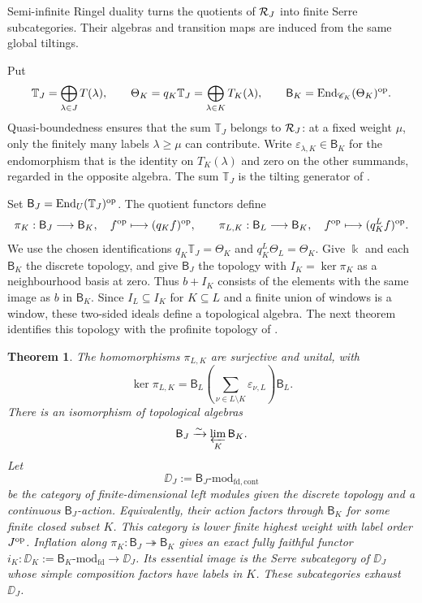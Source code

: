\documentclass[11pt,reqno]{amsart}
\newcommand{\kk}{\Bbbk}\newcommand{\ZZ}{\mathbb Z}\newcommand{\NN}{\mathbb N}
\newcommand{\BJ}{\mathsf B_J}\newcommand{\BK}{\mathsf B_K}\newcommand{\TJ}{\mathbb T_J}\newcommand{\GK}{\mathsf G_K}\newcommand{\GJ}{\mathsf G_J}
\newtheorem{theorem}{Theorem}[section]
\theoremstyle{definition}
\theoremstyle{remark}
\numberwithin{equation}{section}
\begin{document}
Semi-infinite Ringel duality turns the quotients of $\mathcal R_J$ into
finite Serre subcategories. Their algebras and transition maps are
induced from the same global tiltings.

Put
\[
 \TJ=\bigoplus_{\lambda\in J}T(\lambda),\qquad
 \Theta_K=q_K\TJ=\bigoplus_{\lambda\in K}T_K(\lambda),\qquad
 \BK=\End_{\CC_K}(\Theta_K)^{\op}.
\]
Quasi-boundedness ensures that the sum $\TJ$ belongs to $\mathcal R_J$:
at a fixed weight $\mu$, only the finitely many labels
$\lambda\geq\mu$ can contribute. Write
$\varepsilon_{\lambda,K}\in\BK$ for the endomorphism that is the
identity on $T_K(\lambda)$ and zero on the other summands, regarded
in the opposite algebra. The sum $\TJ$ is the tilting generator of
\cite[Definition~4.26]{BS}.

Set $\BJ=\End_U(\TJ)^{\op}$. The quotient functors define
\[
 \pi_K:\BJ\longrightarrow\BK,\quad f^{\op}\longmapsto(q_Kf)^{\op},
 \qquad
 \pi_{L,K}:\mathsf B_L\longrightarrow\BK,\quad
 f^{\op}\longmapsto(q_K^Lf)^{\op}.
\]
We use the chosen identifications $q_K\TJ=\Theta_K$ and
$q_K^L\Theta_L=\Theta_K$. Give $\kk$ and each $\BK$ the discrete
topology, and give $\BJ$ the topology with
$I_K=\ker\pi_K$ as a neighbourhood basis at zero.
Thus $b+I_K$ consists of the elements with the same image as $b$
in $\BK$. Since $I_L\subseteq I_K$ for $K\subseteq L$ and a
finite union of windows is a window, these two-sided ideals define
a topological algebra. The next theorem identifies this topology
with the profinite topology of \cite[Section~2.1, Lemma~2.10]{BS}.

\begin{theorem}\label{thm:ringel}
The homomorphisms $\pi_{L,K}$ are surjective and unital, with
\begin{equation}\label{eq:ringel-kernel}
 \ker\pi_{L,K}=
 \mathsf B_L\left(\sum_{\nu\in L\setminus K}
           \varepsilon_{\nu,L}\right)\mathsf B_L.
\end{equation}
There is an isomorphism of topological algebras
\begin{equation}\label{eq:ringel-limit}
 \BJ\xrightarrow{\sim}
       \varprojlim_K\BK.
\end{equation}
Let
\[
 \DD_J:=\BJ\text{-}\mathrm{mod}_{\mathrm{fd,cont}}
\]
be the category of finite-dimensional left modules given the discrete
topology and a continuous $\BJ$-action. Equivalently, their action
factors through $\BK$ for some finite closed subset $K$.
This category is lower finite highest weight with label order $J^{\mathrm{op}}$.
Inflation along $\pi_K:\BJ\twoheadrightarrow\BK$ gives an exact fully
faithful functor
$i_K:\DD_K:=\BK\text{-}\mathrm{mod}_{\mathrm{fd}}\to\DD_J$.
Its essential image is the Serre subcategory
of $\DD_J$ whose simple composition factors have labels in $K$.
These subcategories exhaust $\DD_J$.
\end{theorem}
\end{document}
